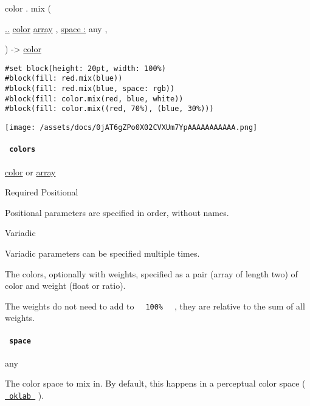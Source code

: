 color { . } { mix } (

{ \hyperref[definitions-mix-parameters-colors]{..}
\href{/docs/reference/visualize/color/}{color}
\href{/docs/reference/foundations/array/}{array} , } {
\hyperref[definitions-mix-parameters-space]{space :} { any } , }

) -\textgreater{} \href{/docs/reference/visualize/color/}{color}

\begin{verbatim}
#set block(height: 20pt, width: 100%)
#block(fill: red.mix(blue))
#block(fill: red.mix(blue, space: rgb))
#block(fill: color.mix(red, blue, white))
#block(fill: color.mix((red, 70%), (blue, 30%)))
\end{verbatim}

\texttt{[image: /assets/docs/0jAT6gZPo0X02CVXUm7YpAAAAAAAAAAA.png]}

\paragraph{\texorpdfstring{\texttt{\ colors\ }}{ colors }}\label{definitions-mix-colors}

\href{/docs/reference/visualize/color/}{color} {or}
\href{/docs/reference/foundations/array/}{array}

{Required} {{ Positional }}

\label{definitions-mix-colors-positional-tooltip}
Positional parameters are specified in order, without names.

{{ Variadic }}

\label{definitions-mix-colors-variadic-tooltip}
Variadic parameters can be specified multiple times.

The colors, optionally with weights, specified as a pair (array of
length two) of color and weight (float or ratio).

The weights do not need to add to
\texttt{\ }{\texttt{\ 100\%\ }}\texttt{\ } , they are relative to the
sum of all weights.

\paragraph{\texorpdfstring{\texttt{\ space\ }}{ space }}\label{definitions-mix-space}

{ any }

The color space to mix in. By default, this happens in a perceptual
color space (
\href{/docs/reference/visualize/color/\#definitions-oklab}{\texttt{\ oklab\ }}
).

